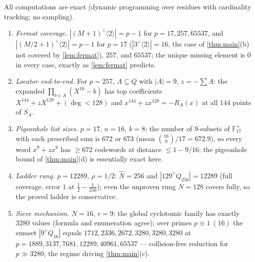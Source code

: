 \documentclass[11pt]{article}
\theoremstyle{definition}
\newcommand{\F}{\mathbb F}
\begin{document}
All computations are exact (dynamic programming over residues with cardinality tracking; no sampling).
\begin{enumerate}[label=V\arabic*.,leftmargin=2.4em]
\item \emph{Fermat coverage.}  $|(M{+}1)^{\wedge}\langle2\rangle|=p-1$ for $p=17,257,65537$, and $|(M/2{+}1)^{\wedge}\langle2\rangle|=p-1$ for $p=17$ ($|3^{\wedge}\langle2\rangle|=16$, the case of \cref{thm:main}(b) not covered by \cref{lem:fermat}), $257$, and $65537$; the unique missing element is $0$ in every case, exactly as \cref{lem:fermat} predicts.
\item \emph{Locator end-to-end.}  For $p=257$, $A\subseteq Q$ with $|A|=9$, $z=-\sum A$: the expanded $\prod_{b\in A}(X^{16}-b)$ has top coefficients $X^{144}+zX^{128}+(\deg<128)$ and $x^{144}+zx^{128}=-R_A(x)$ at all $144$ points of $S_A$.
\item \emph{Pigeonhole list sizes.}  $p=17$, $n=16$, $k=8$: the number of $9$-subsets of $\F_{17}^\times$ with each prescribed sum is $672$ or $673$ (mean $\binom{16}9/17=672.9$), so every word $x^9+zx^8$ has $\ge672$ codewords at distance $\le1-9/16$; the pigeonhole bound of \cref{thm:main}(d) is essentially exact here.
\item \emph{Ladder rung.}  $p=12289$, $\rho=1/2$: $\hat N=256$ and $|129^{\wedge}Q_{256}|=12289$ (full coverage, error $1$ at $\tfrac12-\tfrac1{256}$); even the unproven rung $N=128$ covers fully, so the proved ladder is conservative.
\item \emph{Sieve mechanism.}  $N=16$, $r=9$: the global cyclotomic family has exactly $3280$ values (formula and enumeration agree); over primes $p\equiv1\ (16)$ the sumset $|9^{\wedge}Q_{16}|$ equals $1712,2336,2672,3280,3280,3280$ at $p=1889,3137,7681,12289,40961,65537$ --- collision-free reduction for $p\gg3280$, the regime driving \cref{thm:main}(c).
\end{enumerate}
\end{document}
